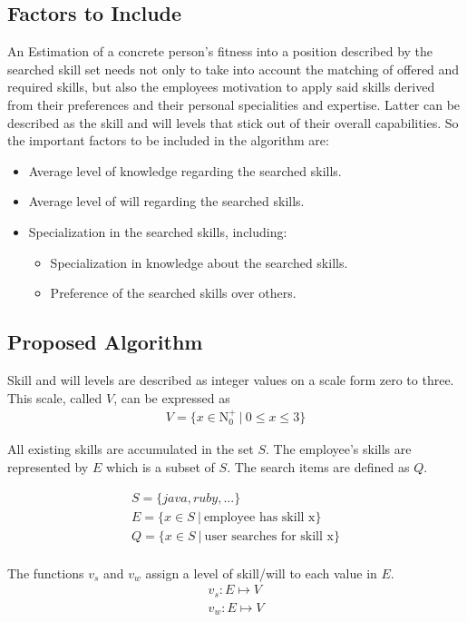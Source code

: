 \subsection{Factors to Include}
An Estimation of a concrete person's fitness into a position described by the searched skill set needs not only to take into account the matching of offered and required skills, but also the employees motivation to apply said skills derived from their preferences and their personal specialities and expertise. Latter can be
described as the skill and will levels that stick out of their overall capabilities. So the important factors to be included in the algorithm are:
\begin{itemize}
  \item Average level of knowledge regarding the searched skills.
  \item Average level of will regarding the searched skills.
  \item Specialization in the searched skills, including:
  \begin{itemize}
    \item Specialization in knowledge about the searched skills.
    \item Preference of the searched skills over others.
  \end{itemize}
\end{itemize}


\subsection{Proposed Algorithm}
Skill and will levels are described as integer values on a scale form zero to three. This scale, called $V$, can be expressed as
\begin{gather*}
  V = \{ x \in \mathrm{N}_0^+ \ | \  0 \leq x \leq 3\}
\end{gather*}

All existing skills are accumulated in the set $S$. The employee's skills are represented by $E$ which is a subset of $S$. The search items are
defined as $Q$.

\begin{gather*}
  S = \{java, ruby, ...\} \\
  E = \{x \in S \ | \ \textrm{employee has skill x}\} \\
  Q = \{x \in S \ | \ \textrm{user searches for skill x}\} \\
\end{gather*}

The functions $v_s$ and $v_w$ assign a level of skill/will to each value in $E$.
\begin{gather*}
  v_s: E \mapsto V \\
  v_w: E \mapsto V \\
\end{gather*}

